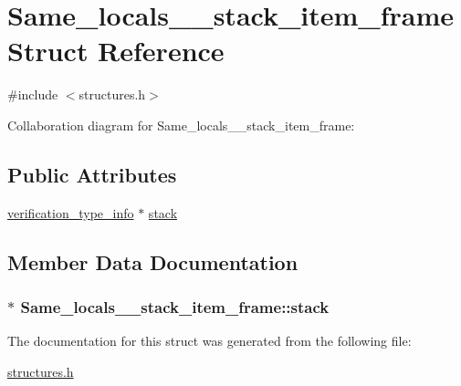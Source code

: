 \hypertarget{structSame__locals__1__stack__item__frame}{}\section{Same\+\_\+locals\+\_\+\_\+stack\+\_\+item\+\_\+frame Struct Reference}
\label{structSame__locals__1__stack__item__frame}


{\ttfamily \#include $<$structures.\+h$>$}



Collaboration diagram for Same\+\_\+locals\+\_\+\_\+stack\+\_\+item\+\_\+frame\+:
\subsection*{Public Attributes}
\begin{DoxyCompactItemize}
\item 
\hyperlink{structverification__type__info}{verification\+\_\+type\+\_\+info} $\ast$ \hyperlink{structSame__locals__1__stack__item__frame_aea334c9e9f4e42aad07a6ec10a7f058a}{stack}
\end{DoxyCompactItemize}


\subsection{Member Data Documentation}
\subsubsection[{\texorpdfstring{stack}{stack}}]{$\ast$ Same\+\_\+locals\+\_\+\_\+stack\+\_\+item\+\_\+frame\+::stack}\hypertarget{structSame__locals__1__stack__item__frame_aea334c9e9f4e42aad07a6ec10a7f058a}{}\label{structSame__locals__1__stack__item__frame_aea334c9e9f4e42aad07a6ec10a7f058a}


The documentation for this struct was generated from the following file\+:\begin{DoxyCompactItemize}
\item 
\hyperlink{structures_8h}{structures.\+h}\end{DoxyCompactItemize}
